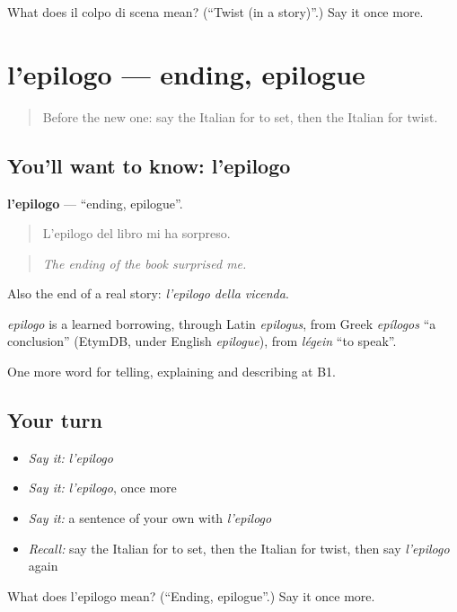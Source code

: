 \begin{tcolorbox}[breakable,colback=teal!4,colframe=teal!35!black,title={Before you move on}]
What does il colpo di scena mean? (\textquotedblleft{}Twist (in a story)\textquotedblright{}.) Say it once more.
\end{tcolorbox}
\section[l'epilogo]{l'epilogo — ending, epilogue}

\label{lesson:IT-C524-epilogo}



\begin{quote}
Before the new one: say the Italian for to set, then the Italian for twist.
\end{quote}

\subsection*{You'll want to know: l'epilogo}
\textbf{l'epilogo} — \textquotedblleft{}ending, epilogue\textquotedblright{}.

\begin{quote}
L'epilogo del libro mi ha sorpreso.
\end{quote}

\begin{quote}
\emph{The ending of the book surprised me.}
\end{quote}

Also the end of a real story: \emph{l'epilogo della vicenda}.

\begin{cousinweb}
\emph{epilogo} is a learned borrowing, through Latin \emph{epilogus}, from Greek \emph{epílogos} \textquotedblleft{}a conclusion\textquotedblright{} (EtymDB, under English \emph{epilogue}), from \emph{légein} \textquotedblleft{}to speak\textquotedblright{}.
\end{cousinweb}

\begin{grammarlens}[title={What you've built}]
One more word for telling, explaining and describing at B1.
\end{grammarlens}

\subsection*{Your turn}
\begin{itemize}
\raggedright
  \item \emph{Say it:} \emph{l'epilogo}
  \item \emph{Say it:} \emph{l'epilogo}, once more
  \item \emph{Say it:} a sentence of your own with \emph{l'epilogo}
  \item \emph{Recall:} say the Italian for to set, then the Italian for twist, then say \emph{l'epilogo} again
\end{itemize}

\begin{tcolorbox}[breakable,colback=teal!4,colframe=teal!35!black,title={Before you move on}]
What does l'epilogo mean? (\textquotedblleft{}Ending, epilogue\textquotedblright{}.) Say it once more.
\end{tcolorbox}
